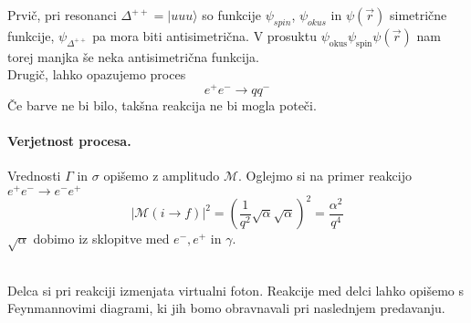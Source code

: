 \documentclass[a4paper]{article}
\newcommand{\vct}[1]{\overrightarrow{#1}}
\begin{document}
Prvič, pri resonanci $\Delta^{++} = |uuu\rangle$ so funkcije $\psi_{spin}$, $\psi_{okus}$ in $\psi(\vct{r})$ simetrične funkcije, $\psi_{\Delta^{++}}$ pa mora biti antisimetrična.
V prosuktu $\psi_{\text{okus}} \psi_{\text{spin}} \psi(\vct{r})$ nam torej manjka še neka antisimetrična funkcija. \\

Drugič, lahko opazujemo proces $$e^+e^- \to qq^-$$
Če barve ne bi bilo, takšna reakcija ne bi mogla poteči.
\paragraph{Verjetnost procesa.} Vrednosti \(\Gamma\) in \(\sigma\) opišemo z amplitudo \(\mathcal{M}\). Oglejmo si na primer reakcijo $e^+ e^- \to e^- e^+$ \\
$$|\mathcal{M}(i \to f)|^2 = \left(\frac{1}{q^2}\sqrt{\alpha}\sqrt{\alpha}\right)^2 = \frac{\alpha^2}{q^4}$$
$\sqrt{\alpha}$ dobimo iz sklopitve med $e^-, e^+$ in $\gamma$.
\begin{figure}[h!]
    \centering
\end{figure} \\
Delca si pri reakciji izmenjata virtualni foton. Reakcije med delci lahko opišemo s Feynmannovimi diagrami, ki jih bomo obravnavali pri naslednjem predavanju.
\end{document}
